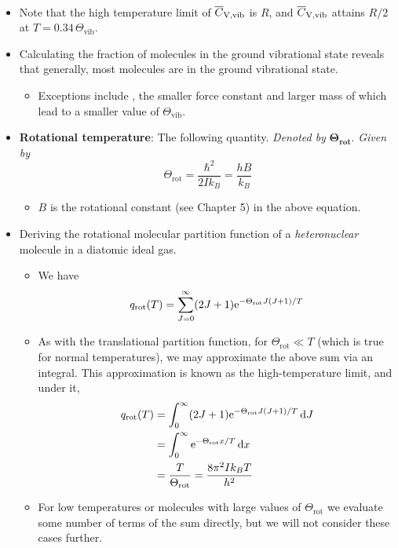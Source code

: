 \documentclass[../notes.tex]{subfiles}
\begin{document}
\begin{itemize}
\begin{gather*}
    \end{gather*}
    \item Note that the high temperature limit of $\overline{C}_\text{V,\text{vib}}$ is $R$, and $\overline{C}_\text{V,\text{vib}}$ attains $R/2$ at $T=0.34\,\Theta_\text{vib}$.
    \item Calculating the fraction of molecules in the ground vibrational state reveals that generally, most molecules are in the ground vibrational state.
    \begin{itemize}
        \item Exceptions include , the smaller force constant and larger mass of which lead to a smaller value of $\Theta_\text{vib}$.
    \end{itemize}
    \item \textbf{Rotational temperature}: The following quantity. \emph{Denoted by} $\bm{\Theta_\text{rot}}$. \emph{Given by}
    \begin{equation*}
        \Theta_\text{rot} = \frac{\hbar^2}{2Ik_B} = \frac{hB}{k_B}
    \end{equation*}
    \begin{itemize}
        \item $B$ is the rotational constant (see Chapter 5) in the above equation.
    \end{itemize}
    \item Deriving the rotational molecular partition function of a \emph{heteronuclear} molecule in a diatomic ideal gas.
    \begin{itemize}
        \item We have
        \begin{equation*}
            q_\text{rot}(T) = \sum_{J=0}^\infty(2J+1)\e[-\Theta_\text{rot}J(J+1)/T]
        \end{equation*}
        \item As with the translational partition function, for $\Theta_\text{rot}\ll T$ (which is true for normal temperatures), we may approximate the above sum via an integral. This approximation is known as the high-temperature limit, and under it,
        \begin{align*}
            q_\text{rot}(T) &= \int_0^\infty(2J+1)\e[-\Theta_\text{rot}J(J+1)/T]\dd{J}\\
            &= \int_0^\infty\e[-\Theta_\text{rot}x/T]\dd{x}\\
            &= \frac{T}{\Theta_\text{rot}} = \frac{8\pi^2Ik_BT}{h^2}
        \end{align*}
        \item For low temperatures or molecules with large values of $\Theta_\text{rot}$ we evaluate some number of terms of the sum directly, but we will not consider these cases further.

\end{itemize}
\end{itemize}
\end{document}
